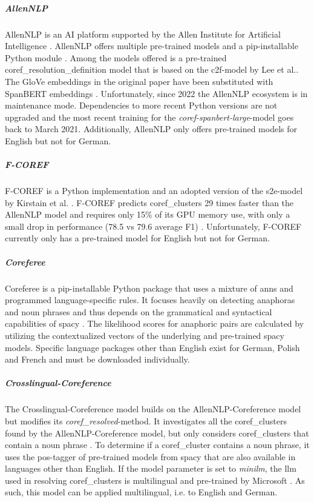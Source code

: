 \subparagraph{AllenNLP}
AllenNLP \cite{AllenNLP} is an AI platform supported by the Allen Institute for Artificial Intelligence \cite{AllenAI}.
AllenNLP offers multiple pre-trained models and a pip-installable Python module \cite{AllenNLP}.
Among the models offered is a pre-trained \gls{coref_resolution_definition} model that is based on the c2f-model by Lee et al.\cite{CorefCoarseFine}.
The GloVe embeddings in the original paper \cite{CorefCoarseFine} have been substituted with \gls{SpanBERT} embeddings \cite{AllenNLPCorefModel}.
Unfortunately, since 2022 the AllenNLP ecosystem is in maintenance mode.
Dependencies to more recent Python versions are not upgraded and the most recent training for the \emph{coref-spanbert-large}-model goes back to March 2021.
Additionally, AllenNLP only offers pre-trained models for English but not for German.

\subparagraph{F-COREF}
F-COREF is a Python implementation and an adopted version of the s2e-model by Kirstain et al. \cite{KirstainCoref}.
F-COREF predicts \glspl{coref_cluster} 29 times faster than the AllenNLP model and requires only 15\% of its GPU memory use, with only a small
drop in performance (78.5 vs 79.6 average F1) \cite{FastCoref}.
Unfortunately, F-COREF currently only has a pre-trained model for English but not for German.

\subparagraph{Coreferee}
Coreferee \cite{Coreferee} is a pip-installable Python package that uses a mixture of \glspl{ann} and programmed language-specific rules.
It focuses heavily on detecting \glspl{anaphora} and noun phrases and thus depends on the grammatical and syntactical capabilities of spacy \cite{spacy}.
The likelihood scores for anaphoric pairs are calculated by utilizing the contextualized vectors of the underlying and pre-trained spacy models.
Specific language packages other than English exist for German, Polish and French and must be downloaded individually.

\subparagraph{Crosslingual-Coreference}\label{subpar:crosslingual-coreference}
The Crosslingual-Coreference model \cite{xxCoref} builds on the AllenNLP-Coreference model \cite{AllenNLPCorefModel} but modifies its \emph{coref\_resolved}-method.
It investigates all the \glspl{coref_cluster} found by the AllenNLP-Coreference model, but only considers \glspl{coref_cluster} that contain a noun phrase \cite{AllenCorefModelModification}.
To determine if a \gls{coref_cluster} contains a noun phrase, it uses the \gls{pos}-tagger of pre-trained models from spacy \cite{spacy} that are also available in languages other than English.
If the model parameter is set to \emph{minilm}, the \gls{llm} used in resolving \glspl{coref_cluster} is multilingual and pre-trained by Microsoft \cite{xxCorefMinilmModel}.
As such, this model can be applied multilingual, i.e. to English and German.

